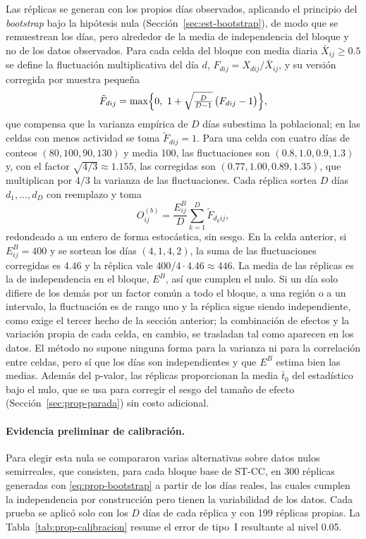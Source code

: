 Las réplicas se generan con los propios días observados, aplicando el principio
del \emph{bootstrap} bajo la hipótesis nula (Sección~\ref{sec:est-bootstrap}), de modo
que se remuestrean los días, pero alrededor de la media de independencia del bloque y
no de los datos observados. Para cada celda del
bloque con media diaria $\bar X_{ij}\ge 0.5$ se define la fluctuación
multiplicativa del día $d$, $F_{dij} = X_{dij}/\bar X_{ij}$, y su versión
corregida por muestra pequeña
\begin{equation}\label{eq:prop-fluctuacion}
  \tilde F_{dij} = \max\Bigl\{0,\ 1 + \sqrt{\tfrac{D}{D-1}}\,\bigl(F_{dij}-1\bigr)\Bigr\},
\end{equation}
que compensa que la varianza empírica de $D$ días subestima la poblacional; en
las celdas con menos actividad se toma $\tilde F_{dij}=1$. Para una celda con
cuatro días de conteos $(80,100,90,130)$ y media 100, las fluctuaciones son
$(0.8,1.0,0.9,1.3)$ y, con el factor $\sqrt{4/3}\approx1.155$, las corregidas son
$(0.77,1.00,0.89,1.35)$, que multiplican por $4/3$ la varianza de las
fluctuaciones. Cada réplica sortea
$D$ días $d_1,\dots,d_D$ con reemplazo y toma
\begin{equation}\label{eq:prop-bootstrap}
  O^{(b)}_{ij} = \frac{E^B_{ij}}{D}\sum_{k=1}^{D} \tilde F_{d_k ij},
\end{equation}
redondeado a un entero de forma estocástica, sin sesgo. En la celda anterior, si
$E^B_{ij}=400$ y se sortean los días $(4,1,4,2)$, la suma de las fluctuaciones
corregidas es $4.46$ y la réplica vale $400/4\cdot4.46\approx446$. La media de las réplicas
es la de independencia en el bloque, $E^B$, así que cumplen el nulo. Si un día
solo difiere de los demás por un factor común a todo el bloque, a una región o
a un intervalo, la fluctuación es de rango uno y la réplica sigue siendo
independiente, como exige el tercer hecho de la sección anterior; la combinación
de efectos y la variación propia de cada celda, en cambio, se trasladan tal como
aparecen en los datos. El método no supone ninguna forma para la varianza ni
para la correlación entre celdas, pero sí que los días son independientes y que
$E^B$ estima bien las medias. Además del p-valor, las réplicas proporcionan la
media $\bar t_0$ del estadístico bajo el nulo, que se usa para corregir el sesgo
del tamaño de efecto (Sección~\ref{sec:prop-parada}) sin costo adicional.

\paragraph{Evidencia preliminar de calibración.} Para elegir esta nula se
compararon varias alternativas sobre datos nulos semirreales, que consisten, para cada bloque
base de ST-CC, en 300 réplicas generadas con \eqref{eq:prop-bootstrap} a partir de
los días reales, las cuales cumplen la independencia por construcción pero tienen la
variabilidad de los datos. Cada prueba se aplicó solo con los $D$ días de cada
réplica y con 199 réplicas propias. La Tabla~\ref{tab:prop-calibracion} resume
el error de tipo~I resultante al nivel 0.05.


